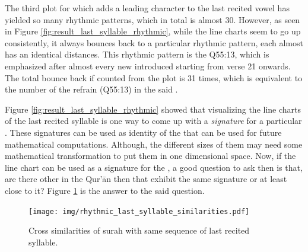 The third plot for   which adds a leading character to the last recited vowel has yielded so many rhythmic patterns, which in total is almost 30. However, as seen in Figure \ref{fig:result_last_syllable_rhythmic}, while the line charts seem to go up consistently, it always bounces back to a particular rhythmic pattern, each almost has an identical distances. This rhythmic pattern is the Q55:13, which is emphasized after almost every new   introduced starting from verse 21 onwards. The total bounce back if counted from the plot is 31 times, which is equivalent to the number of the refrain (Q55:13) in the said  . 

Figure \ref{fig:result_last_syllable_rhythmic} showed that visualizing the line charts of the last recited syllable is one way to come up with a \textit{signature} for a particular  . These signatures can be used as identity of the   that can be used for future mathematical computations. Although, the different sizes of them may need some mathematical transformation to put them in one dimensional space. Now, if the line chart can be used as a signature for the  , a good question to ask then is that, are there other   in the Qur'\=an then that exhibit the same signature or at least close to it? Figure \ref{fig:result_last_syllable_rhythmic_cross_similarities} is the answer to the said question.

\begin{figure}[!t]
    \centering
    \texttt{[image: img/rhythmic\_last\_syllable\_similarities.pdf]}
    \caption{Cross similarities of surah with same sequence of last recited syllable.}
    \label{fig:result_last_syllable_rhythmic_cross_similarities}
\end{figure}

